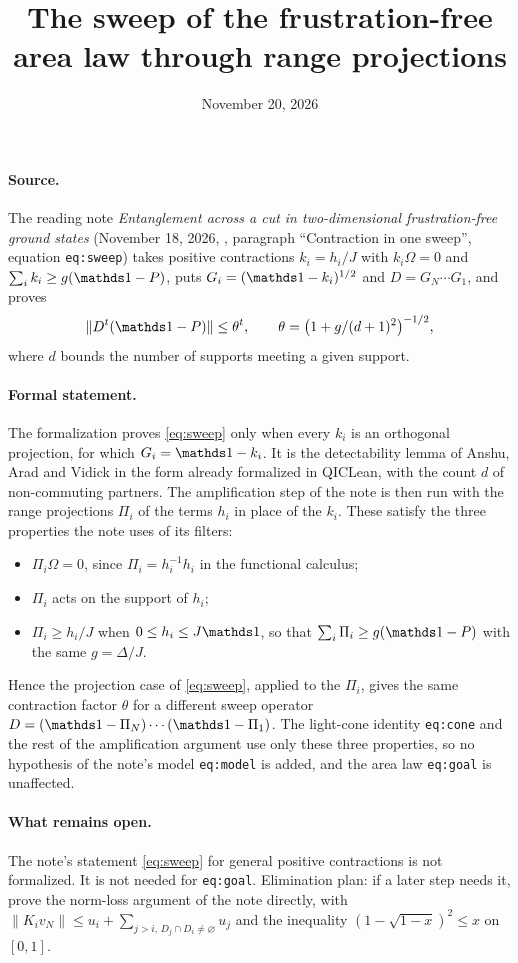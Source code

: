 \documentclass{article}
\title{The sweep of the frustration-free area law through range projections}
\author{}
\date{November 20, 2026}
\begin{document}
\maketitle
{}

\paragraph{Source.}
The reading note \emph{Entanglement across a cut in two-dimensional
frustration-free ground states} (November 18, 2026,
,
paragraph ``Contraction in one sweep'', equation \texttt{eq:sweep}) takes
positive contractions $k_i=h_i/J$ with $k_i\Omega=0$ and
$\sum_ik_i\ge g(\Id-P)$, puts $G_i=(\Id-k_i)^{1/2}$ and $D=G_N\cdots G_1$, and
proves
\begin{equation}
  \|D^t(\Id-P)\|\le\theta^t,\qquad \theta=\bigl(1+g/(d+1)^2\bigr)^{-1/2},
  \label{eq:sweep}
\end{equation}
where $d$ bounds the number of supports meeting a given support.

\paragraph{Formal statement.}
The formalization proves \eqref{eq:sweep} only when every $k_i$ is an
orthogonal projection, for which $G_i=\Id-k_i$. It is the detectability lemma
of Anshu, Arad and Vidick in the form already formalized in QICLean, with the
count $d$ of non-commuting partners. The amplification step of the note is
then run with the range projections $\Pi_i$ of the terms $h_i$ in place of the
$k_i$. These satisfy the three properties the note uses of its filters:
\begin{itemize}
  \item $\Pi_i\Omega=0$, since $\Pi_i=h_i^{-1}h_i$ in the functional calculus;
  \item $\Pi_i$ acts on the support of $h_i$;
  \item $\Pi_i\ge h_i/J$ when $0\le h_i\le J\Id$, so that
        $\sum_i\Pi_i\ge g(\Id-P)$ with the same $g=\Delta/J$.
\end{itemize}
Hence the projection case of \eqref{eq:sweep}, applied to the $\Pi_i$, gives
the same contraction factor $\theta$ for a different sweep operator
$D=(\Id-\Pi_N)\cdots(\Id-\Pi_1)$. The light-cone identity
\texttt{eq:cone} and the rest of the amplification argument use only these
three properties, so no hypothesis of the note's model \texttt{eq:model} is
added, and the area law \texttt{eq:goal} is unaffected.

\paragraph{What remains open.}
The note's statement \eqref{eq:sweep} for general positive contractions is not
formalized. It is not needed for \texttt{eq:goal}. Elimination plan: if a later
step needs it, prove the norm-loss argument of the note directly, with
$\|K_iv_N\|\le u_i+\sum_{j>i,\,D_j\cap D_i\ne\varnothing}u_j$ and the
inequality $(1-\sqrt{1-x})^2\le x$ on $[0,1]$.
\end{document}
